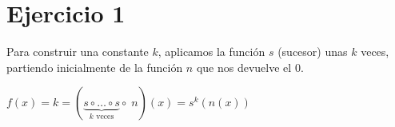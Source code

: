 \section*{Ejercicio 1}

Para construir una constante $k$, aplicamos la función $s$ (sucesor) unas $k$ veces, partiendo inicialmente de la función $n$ que nos devuelve el $0$.

$f(x) = k = (\underbrace{s \circ \dots \circ s}_{\text{$k$ veces}} \circ \; n)(x) = s^k(n(x))$
